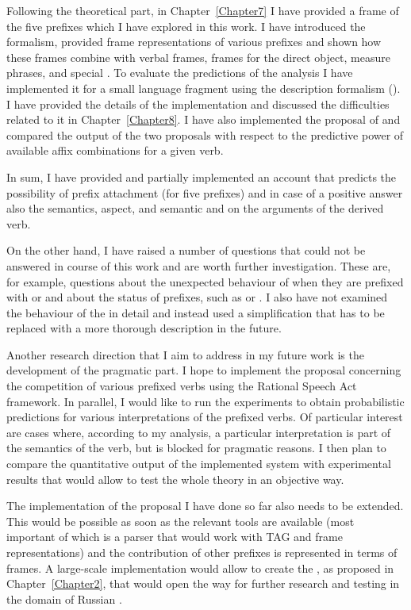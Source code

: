 Following the theoretical part,  in Chapter~\ref{Chapter7} I have provided a frame  of the five prefixes which I have explored in this work. I have introduced the formalism, provided frame representations of various prefixes and shown how these frames combine with verbal frames, frames for the direct object, measure phrases, and special . To evaluate the predictions of the analysis I have implemented it for a small language fragment using the  description formalism (). I have provided the details of the implementation and discussed the difficulties related to it in Chapter~\ref{Chapter8}. I have also implemented the proposal of \citet{Tatevosov:09} and compared the output of the two proposals with respect to the predictive power of available affix combinations for a given verb. 

In sum, I have provided and partially implemented an account that predicts the possibility of prefix attachment (for five prefixes) and in case of a positive answer also the semantics, aspect, and semantic and  on the arguments of the derived verb.\largerpage

On the other hand, I have raised a number of questions that could not be answered in course of this work and are worth further investigation. These are, for example, questions about the unexpected behaviour of   when they are prefixed with  or  and about the status of  prefixes, such as  or . I also have not examined the behaviour of the  in detail and instead used a simplification that has to be replaced with a more thorough description in the future. 

Another research direction that I aim to address in my future work is the development of the pragmatic part. I hope to implement the proposal concerning the competition of various prefixed verbs using the Rational Speech Act framework. In parallel, I would like to run the experiments to obtain probabilistic predictions for various interpretations of the prefixed verbs.  Of particular interest are cases where, according to my analysis, a particular interpretation is part of the semantics of the verb, but is blocked for pragmatic reasons. I then plan to compare the quantitative output of the implemented system with experimental results that would allow to test the whole theory in an objective way.

The implementation of the proposal I have done so far also needs to be extended. This would be possible as soon as the relevant tools are available (most important of which is a parser that would work with TAG and frame representations) and the contribution of other prefixes is represented in terms of frames. A large-scale implementation would allow to create the , as proposed in Chapter~\ref{Chapter2}, that would open the way for further research and testing in the domain of Russian . 
